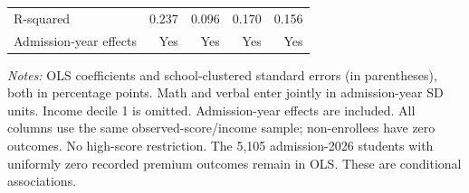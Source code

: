 \begin{table}[!htbp]
\begin{tabular}{lrrrr}
R-squared & 0.237 & 0.096 & 0.170 & 0.156 \\
Admission-year effects & Yes & Yes & Yes & Yes \\
\hline\hline\end{tabular}
\begin{minipage}{0.98\textwidth}\footnotesize
\textit{Notes:} OLS coefficients and school-clustered standard errors (in parentheses), both in percentage points. Math and verbal enter jointly in admission-year SD units. Income decile 1 is omitted. Admission-year effects are included. All columns use the same observed-score/income sample; non-enrollees have zero outcomes. No high-score restriction. The 5,105 admission-2026 students with uniformly zero recorded premium outcomes remain in OLS. These are conditional associations.
\end{minipage}
\end{table}
